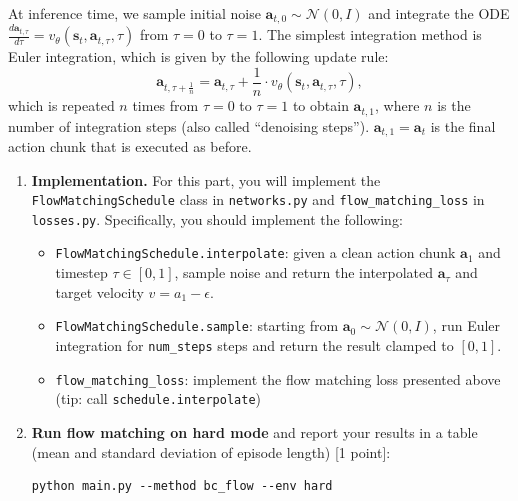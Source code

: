 \documentclass[12pt]{article}
\begin{document}
At inference time, we sample initial noise $\mathbf{a}_{t,0} \sim \mathcal{N}(0, I)$ and integrate the ODE $\frac{d\mathbf{a}_{t,\tau}}{d\tau} = v_\theta(\mathbf{s}_t, \mathbf{a}_{t,\tau}, \tau)$ from $\tau = 0$ to $\tau = 1$.
The simplest integration method is Euler integration, which is given by the following update rule:
\begin{equation}
    \mathbf{a}_{t,\tau+\frac{1}{n}} = \mathbf{a}_{t,\tau} + \frac{1}{n} \cdot v_\theta(\mathbf{s}_t, \mathbf{a}_{t,\tau}, \tau),
\end{equation}
which is repeated $n$ times from $\tau = 0$ to $\tau = 1$ to obtain $\mathbf{a}_{t,1}$, where $n$ is the number of integration steps (also called ``denoising steps''). $\mathbf{a}_{t,1} = \mathbf{a}_t$ is the final action chunk that is executed as before.

\begin{enumerate}

\item \textbf{Implementation.} For this part, you will implement the \texttt{FlowMatchingSchedule} class in \texttt{networks.py} and \texttt{flow\_matching\_loss} in \texttt{losses.py}. Specifically, you should implement the following:

\begin{itemize}
    \item \texttt{FlowMatchingSchedule.interpolate}: given a clean action chunk $\textbf{a}_1$ and timestep $\tau \in [0,1]$, sample noise and return the interpolated $\textbf{a}_\tau$ and target velocity $v = a_1 - \epsilon$.
    \item \texttt{FlowMatchingSchedule.sample}: starting from $\textbf{a}_0 \sim \mathcal{N}(0, I)$, run Euler integration for \texttt{num\_steps} steps and return the result clamped to $[0,1]$.
    \item \texttt{flow\_matching\_loss}: implement the flow matching loss presented above (tip: call \texttt{schedule.interpolate})
\end{itemize}

\item \textbf{Run flow matching on hard mode} and report your results in a table (mean and standard deviation of episode length) [1 point]:

\begin{tcolorbox}[width=\linewidth, sharp corners=all, colback=white!95!black]
\begin{verbatim}
python main.py --method bc_flow --env hard
\end{verbatim}
\end{tcolorbox}


\end{enumerate}
\end{document}
